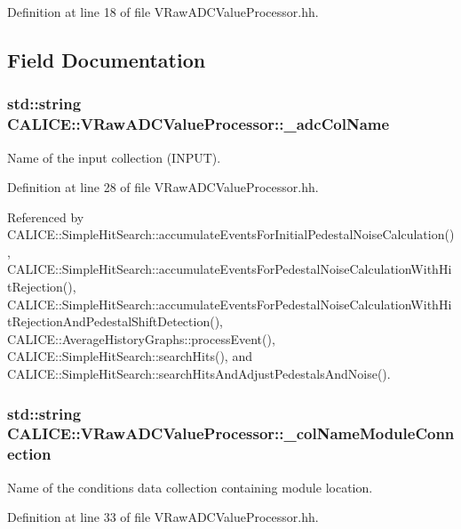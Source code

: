 Definition at line 18 of file VRawADCValueProcessor.hh.

\subsection{Field Documentation}
\subsubsection[{\_\-adcColName}]{\setlength{\rightskip}{0pt plus 5cm}std::string {\bf CALICE::VRawADCValueProcessor::\_\-adcColName}\hspace{0.3cm}{\ttfamily  [protected]}}\label{classCALICE_1_1VRawADCValueProcessor_a9af055c07a4e40284ba7851ee901d7af}


Name of the input collection (INPUT). 

Definition at line 28 of file VRawADCValueProcessor.hh.

Referenced by CALICE::SimpleHitSearch::accumulateEventsForInitialPedestalNoiseCalculation(), CALICE::SimpleHitSearch::accumulateEventsForPedestalNoiseCalculationWithHitRejection(), CALICE::SimpleHitSearch::accumulateEventsForPedestalNoiseCalculationWithHitRejectionAndPedestalShiftDetection(), CALICE::AverageHistoryGraphs::processEvent(), CALICE::SimpleHitSearch::searchHits(), and CALICE::SimpleHitSearch::searchHitsAndAdjustPedestalsAndNoise().
\subsubsection[{\_\-colNameModuleConnection}]{\setlength{\rightskip}{0pt plus 5cm}std::string {\bf CALICE::VRawADCValueProcessor::\_\-colNameModuleConnection}\hspace{0.3cm}{\ttfamily  [protected]}}\label{classCALICE_1_1VRawADCValueProcessor_a186586ecdee3ab773bdd40ad3e8594dc}


Name of the conditions data collection containing module location. 

Definition at line 33 of file VRawADCValueProcessor.hh.
